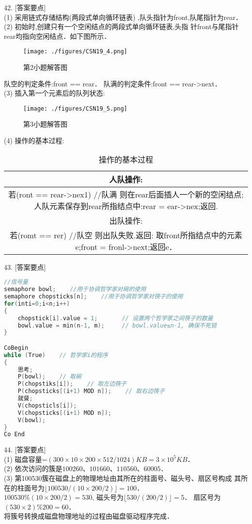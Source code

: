 42. [答案要点] \\
(1) 采用链式存储结构(两段式单向循环链表) ,队头指针为front,队尾指针为rear． \\
(2) 初始时,创建只有一个空闲结点的两段式单向循环链表,头指
针front与尾指针rear均指向空闲结点．如下图所示．
\begin{figure}[ht]
\centering
\texttt{[image: ./figures/CSN19\_4.png]}
\caption{第2小题解答图} \label{CSN19_fig4}
\end{figure}
队空的判定条件:front == rear．
队满的判定条件:front == rear->next． \\
(3) 插入第一个元素后的队列状态:
\begin{figure}[ht]
\centering
\texttt{[image: ./figures/CSN19\_5.png]}
\caption{第3小题解答图} \label{CSN19_fig5}
\end{figure}
(4) 操作的基本过程: \\
\begin{table}[ht]
\centering
\caption{操作的基本过程}\label{CSN19_tab1}
\begin{tabular}{|c|}
\hline
人队操作: \\
\hline
若(ront == rear->nex1)    //队满
则在rear后面插人一个新的空闲结点;
人队元素保存到rear所指结点中:rear = ear->nex;返回. \\
\hline
出队操作: \\
\hline
若(romt == rer)    //队空
则出队失败.返回:
取front所指结点中的元素e;front = fronl->next;返回e． \\
\hline
\end{tabular}
\end{table}

43. [答案要点]
\begin{lstlisting}[language=cpp]
//信号量
semaphore bowl;    //用于协调哲学家对碗的使用
semaphore chopsticks[n];    //用于协调哲学家对筷子的使用
for(inti=0;i<n;i++)
{
    chopstick[i].value = 1;       // 设置两个哲学家之间筷子的数量
    bowl.value = min(n-1, m);     // bowl.value≤n-1, 确保不死锁
}

CoBegin
while (True)    // 哲学家i的程序
{
    思考;
    P(bowl);    // 取碗
    P(chopstiks[i]);    // 取左边筷子
    P(chopsticks[(i+1) MOD n]);    // 取右边筷子
    就餐;
    V(chopsticls[i]);
    V(chopsticks[(i+1) MOD n]);
    V(bowl);
}
Co End
\end{lstlisting}

44. [答案要点] \\
(1) 磁盘容量=$(300\times10\times200\times512/1024)KB=3\times10^5KB$． \\
(2) 依次访问的簇是$100 260$、$101 660$、$110 560$、$60 005$． \\
(3) 第100530簇在磁盘上的物理地址由其所在的柱面号、磁头号、扇区号构成
其所在的柱面号为$\lfloor100530/(10\times200/2)\rfloor=100$． \\
$100530\%(10\times200/2)=530$, 磁头号为$\lfloor530/(200/2)\rfloor=5$．
扇区号为$(530\times2)\%200=60$． \\
将簇号转换成磁盘物理地址的过程由磁盘驱动程序完成．

